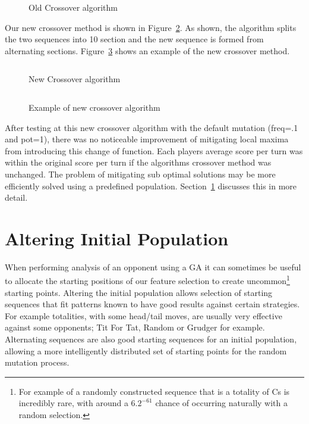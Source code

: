 \begin{figure}[h]
    \inputminted{python}{code_snippets/oldCrossover.py}
    \caption{Old Crossover algorithm}\label{fig:oldCrossover}
\end{figure}

Our new crossover method is shown in Figure~\ref{fig:newCrossover}.
As shown, the algorithm splits the two sequences into 10 section and the new sequence is formed from alternating sections.
Figure~\ref{fig:newCrossoverEX} shows an example of the new crossover method.

\begin{figure}[h]
    \inputminted{python}{code_snippets/newCrossover.py}
    \caption{New Crossover algorithm}\label{fig:newCrossover}
\end{figure}

\begin{figure}[h]
    \inputminted{python}{code_snippets/newCrossoverEX.py}
    \caption{Example of new crossover algorithm}\label{fig:newCrossoverEX}
\end{figure}

After testing at this new crossover algorithm with the default mutation (freq=.1 and pot=1), there was no noticeable improvement of mitigating local maxima from introducing this change of function.
Each players average score per turn was within the original score per turn if the algorithms crossover method was unchanged.
The problem of mitigating sub optimal solutions may be more efficiently solved using a predefined population.
Section~\ref{sec:alteringinitialpopulation} discusses this in more detail.

\section{Altering Initial Population}\label{sec:alteringinitialpopulation}
When performing analysis of an opponent using a GA it can sometimes be useful to allocate the starting positions of our feature selection to create uncommon\footnote{For example of a randomly constructed sequence that is a totality of Cs is incredibly rare, with around a \(6.2^{-61}\) chance of occurring naturally with a random selection.} starting points.
Altering the initial population allows selection of starting sequences that fit patterns known to have good results against certain strategies.
For example totalities, with some head/tail moves, are usually very effective against some opponents;
Tit For Tat, Random or Grudger for example.
Alternating sequences are also good starting sequences for an initial population, allowing a more intelligently distributed set of starting points for the random mutation process.

